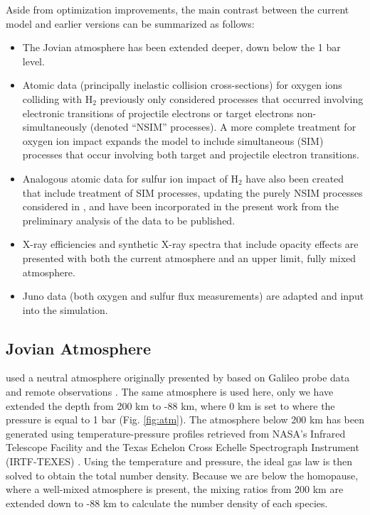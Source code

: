 \documentclass[draft]{agujournal2018}
\begin{document}
Aside from optimization improvements, the main contrast between the current model and earlier versions can be summarized as follows:
\begin{itemize}
\item The Jovian atmosphere has been extended deeper, down below the 1 bar level.
\item Atomic data (principally inelastic collision cross-sections) for oxygen ions colliding with H$_2$ previously \citep{ozak2013,schultz2017} only considered processes that occurred involving electronic transitions of projectile electrons or target electrons non-simultaneously (denoted ``NSIM'' processes).  A more complete treatment for oxygen \citep{schultz2019} ion impact expands the model to include simultaneous (SIM) processes that occur involving both target and projectile electron transitions.
\item Analogous atomic data for sulfur ion impact of H$_2$ have also been created \citep{gharibnejad2019} that include treatment of SIM processes, updating the purely NSIM processes considered in \citet{ozak2013}, and have been incorporated in the present work from the preliminary analysis of the data to be published.
\item X-ray efficiencies and synthetic X-ray spectra that include opacity effects are presented with both the current atmosphere and an upper limit, fully mixed atmosphere.
\item Juno data (both oxygen and sulfur flux measurements) are adapted and input into the simulation.
\end{itemize}

\subsection{Jovian Atmosphere}
\label{sec:atm}

\citet{houston2018} used a neutral atmosphere originally presented by \citet{maurellis2001} based on Galileo probe data \citep{seiff1996,seiff1997} and remote observations \citep{sada1998}.
The same atmosphere is used here, only we have extended the depth from 200 km to -88 km, where 0 km is set to where the pressure is equal to 1 bar (Fig. \ref{fig:atm}).
The atmosphere below 200 km has been generated using temperature-pressure profiles retrieved from NASA's Infrared Telescope Facility and the Texas Echelon Cross Echelle Spectrograph Instrument (IRTF-TEXES) \citep{sinclair2018}.
Using the temperature and pressure, the ideal gas law is then solved to obtain the total number density.
Because we are below the homopause, where a well-mixed atmosphere is present, the mixing ratios from 200 km are extended down to -88 km to calculate the number density of each species.
\end{document}
